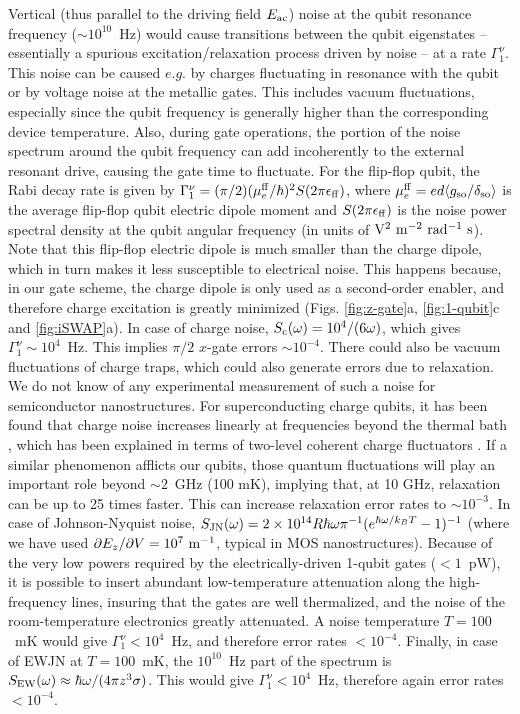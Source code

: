 Vertical (thus parallel to the driving field $E_{\rm ac}$) noise at the qubit resonance frequency ($\sim 10^{10}$~Hz) would cause transitions between the qubit eigenstates -- essentially a spurious excitation/relaxation process driven by noise -- at a rate $\Gamma_1^{\nu}$. This noise can be caused $e.g.$ by charges fluctuating in resonance with the qubit or by voltage noise at the metallic gates. This includes vacuum fluctuations, especially since the qubit frequency is generally higher than the corresponding device temperature. Also, during gate operations, the portion of the noise spectrum %
around the qubit frequency can add incoherently to the external resonant drive, causing the gate time to fluctuate. For the flip-flop qubit, the Rabi decay rate is given by $\Gamma_1^\nu=(\pi/2)(\mu_e^{\rm ff}/\hbar)^2S(2\pi\epsilon_{\rm ff})$, where $\mu_e^{\rm ff}=ed\langle g_{\rm so}/\delta_{\rm so}\rangle$ is the average flip-flop qubit electric dipole moment and $S(2\pi\epsilon_{\rm ff})$ is the noise power spectral density at the qubit angular frequency (in units of ${\rm V^2~m^{-2}~rad^{-1}~s}$). Note that this flip-flop electric dipole is much smaller than the charge dipole, which in turn makes it less susceptible to electrical noise. This happens because, in our gate scheme, the charge dipole is only used as a second-order enabler, and therefore charge excitation is greatly minimized (Figs. \ref{fig:z-gate}a, \ref{fig:1-qubit}c and \ref{fig:iSWAP}a). In case of charge noise, $S_{\rm c}(\omega)=10^4/(6\omega)$, which gives $\Gamma_1^\nu\sim10^4$~Hz. This implies $\pi/2$ $x$-gate errors $\sim10^{-4}$. There could also be vacuum fluctuations of charge traps, which could also generate errors due to relaxation. We do not know of any experimental measurement of such a noise for semiconductor nanostructures. For superconducting charge qubits, it has been found that charge noise increases linearly at frequencies beyond the thermal bath \cite{Astafiev2004S}, which has been explained in terms of two-level coherent charge fluctuators \cite{Shnirman2005S}. If a similar phenomenon afflicts our qubits, those quantum fluctuations will play an important role beyond $\sim2$~GHz (100 mK), implying that, at 10 GHz, relaxation can be up to 25 times faster. This can increase relaxation error rates to $\sim10^{-3}$. In case of Johnson-Nyquist noise, $S_{\rm JN}(\omega)= 2\times10^{14}R\hbar\omega\pi^{-1}(e^{\hbar\omega/k_BT}-1)^{-1}$ (where we have used $\partial E_z/\partial V=10^7~{\rm m^{-1}}$, typical in MOS nanostructures). Because of the very low powers required by the electrically-driven 1-qubit gates ($<1$~pW), it is possible to insert abundant low-temperature attenuation along the high-frequency lines, insuring that the gates are well thermalized, and the noise of the room-temperature electronics greatly attenuated. A noise temperature $T=100$~mK would give $\Gamma_1^\nu<10^4$~Hz, and therefore error rates $<10^{-4}$. Finally, in case of EWJN at $T=100$~mK, the $10^{10}$~Hz part of the spectrum is \cite{Henkel1999S,Poudel2013S} $S_{\rm EW}(\omega)\approx\hbar\omega/(4\pi z^3\sigma)$. This would give $\Gamma_1^\nu<10^4$~Hz, therefore again error rates $<10^{-4}$.

